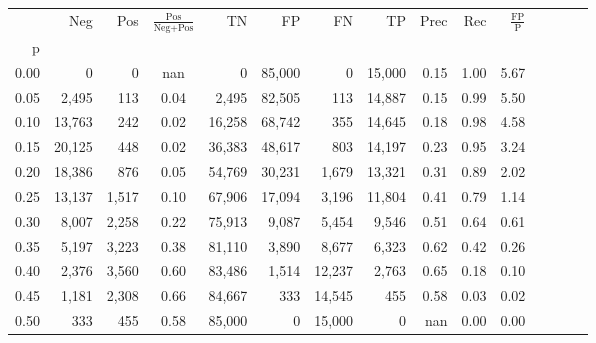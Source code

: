 \begin{tabular}{rrrcrrrrrrrrrrr}
\toprule
{} &     Neg &    Pos & $\frac{\text{Pos}}{\text{Neg}+\text{Pos}}$ &      TN &      FP &      FN &      TP &  Prec &   Rec & $\frac{\text{FP}}{\text{P}}$ \\
p    &         &        &                                            &         &         &         &         &       &       &                              \\
\midrule
0.00 &       0 &      0 &                                        nan &       0 &  85,000 &       0 &  15,000 &  0.15 &  1.00 &                         5.67 \\
0.05 &   2,495 &    113 &                                       0.04 &   2,495 &  82,505 &     113 &  14,887 &  0.15 &  0.99 &                         5.50 \\
0.10 &  13,763 &    242 &                                       0.02 &  16,258 &  68,742 &     355 &  14,645 &  0.18 &  0.98 &                         4.58 \\
0.15 &  20,125 &    448 &                                       0.02 &  36,383 &  48,617 &     803 &  14,197 &  0.23 &  0.95 &                         3.24 \\
0.20 &  18,386 &    876 &                                       0.05 &  54,769 &  30,231 &   1,679 &  13,321 &  0.31 &  0.89 &                         2.02 \\
0.25 &  13,137 &  1,517 &                                       0.10 &  67,906 &  17,094 &   3,196 &  11,804 &  0.41 &  0.79 &                         1.14 \\
0.30 &   8,007 &  2,258 &                                       0.22 &  75,913 &   9,087 &   5,454 &   9,546 &  0.51 &  0.64 &                         0.61 \\
0.35 &   5,197 &  3,223 &                                       0.38 &  81,110 &   3,890 &   8,677 &   6,323 &  0.62 &  0.42 &                         0.26 \\
0.40 &   2,376 &  3,560 &                                       0.60 &  83,486 &   1,514 &  12,237 &   2,763 &  0.65 &  0.18 &                         0.10 \\
0.45 &   1,181 &  2,308 &                                       0.66 &  84,667 &     333 &  14,545 &     455 &  0.58 &  0.03 &                         0.02 \\
0.50 &     333 &    455 &                                       0.58 &  85,000 &       0 &  15,000 &       0 &   nan &  0.00 &                         0.00 \\

\end{tabular}
